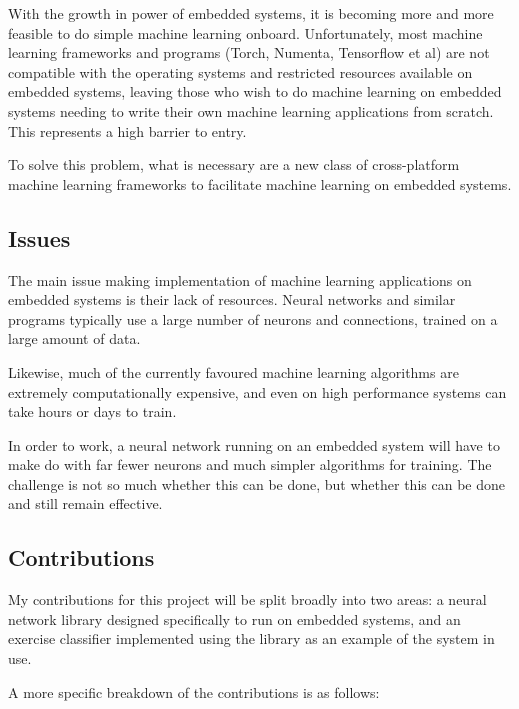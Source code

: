 \documentclass[a4paper]{article}
\begin{document}
With the growth in power of embedded systems, it is becoming more and more feasible to do simple machine learning onboard. Unfortunately, most machine learning frameworks and programs (Torch, Numenta, Tensorflow et al) are not compatible with the operating systems and restricted resources available on embedded systems, leaving those who wish to do machine learning on embedded systems needing to write their own machine learning applications from scratch. This represents a high barrier to entry.

To solve this problem, what is necessary are a new class of cross-platform machine learning frameworks to facilitate machine learning on embedded systems.

\subsection{Issues}%

The main issue making implementation of machine learning applications on embedded systems is their lack of resources. Neural networks and similar programs typically use a large number of neurons and connections, trained on a large amount of data.

Likewise, much of the currently favoured machine learning algorithms are extremely computationally expensive, and even on high performance systems can take hours or days to train.

In order to work, a neural network running on an embedded system will have to make do with far fewer neurons and much simpler algorithms for training. The challenge is not so much whether this can be done, but whether this can be done and still remain effective.

\subsection{Contributions}%

My contributions for this project will be split broadly into two areas: a neural network library designed specifically to run on embedded systems, and an exercise classifier implemented using the library as an example of the system in use.

A more specific breakdown of the contributions is as follows:
\end{document}
